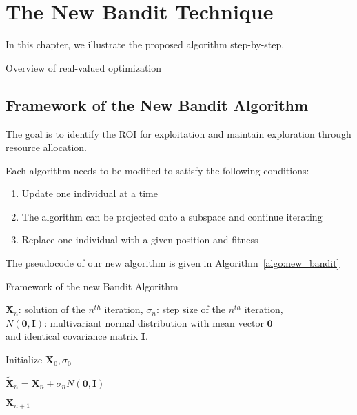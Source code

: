 \chapter{The New Bandit Technique}
\label{chapter:new_bandit}

In this chapter, we illustrate the proposed algorithm step-by-step. 

Overview of real-valued optimization

\section{Framework of the New Bandit Algorithm}

The goal is to identify the ROI for exploitation and maintain exploration through resource allocation.

Each algorithm needs to be modified to satisfy the following conditions:
\begin{enumerate}
    \item Update one individual at a time 
    \item The algorithm can be projected onto a subspace and continue iterating
    \item Replace one individual with a given position and fitness
\end{enumerate}

The pseudocode of our new algorithm is given in Algorithm~\ref{algo:new_bandit}

\begin{algorithm}%
\caption{Framework of the new Bandit Algorithm}\label{algo:new_banidt}

$\boldsymbol{X}_{n}$: solution of the $n^{th}$ iteration, $\sigma_n$: step size of the $n^{th}$ iteration, \\
$N(\boldsymbol{0}, \boldsymbol{I})$: multivariant normal distribution with mean vector $\boldsymbol{0}$ \\ 
and identical covariance matrix $\boldsymbol{I}$.

\BlankLine
{} 

\BlankLine
Initialize $\boldsymbol{X}_0, \sigma_0$ \\
 {

    $\widetilde{\boldsymbol{X}}_n = \boldsymbol{X}_n + \sigma_n N(\boldsymbol{0}, \boldsymbol{I})$  \\

}

\Return $\boldsymbol{X}_{n+1}$

\end{algorithm}





